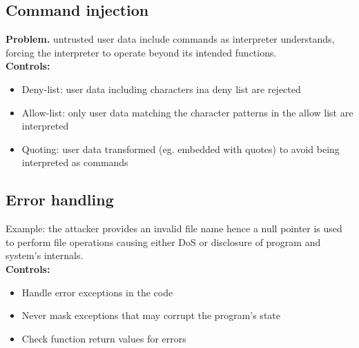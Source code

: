 \documentclass[10pt,a4paper]{article}
\begin{document}
\subsection{Command injection}
\textbf{Problem.} untrusted user data include commands as interpreter understands, forcing the interpreter to operate beyond its intended functions.\\
\textbf{Controls:}
\begin{itemize}
\item Deny-list: user data including characters ina deny list are rejected
\item Allow-list: only user data matching the character patterns in the allow list are interpreted
\item Quoting: user data transformed (eg. embedded with quotes) to avoid being interpreted as commands
\end{itemize}
\subsection{Error handling}
Example: the attacker provides an invalid file name hence a null pointer is used to perform file operations causing either DoS or disclosure of program and system's internals.\\
\textbf{Controls:}
\begin{itemize}
\item Handle error exceptions in the code
\item Never mask exceptions that may corrupt the program's state
\item Check function return values for errors
\end{itemize}
\newpage
\end{document}
